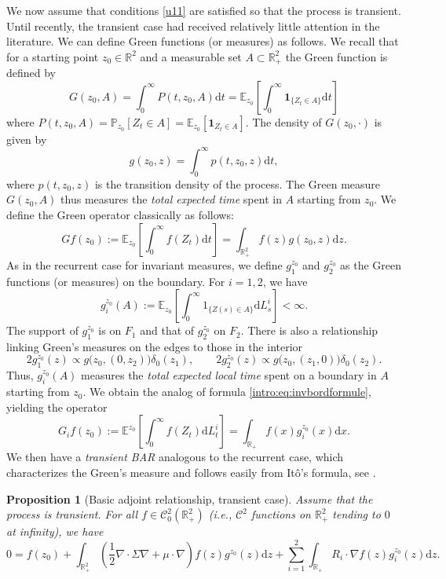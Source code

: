 \documentclass[11pt]{article}
\newcommand\citeS[1]{\cite{#1}}
\newtheorem{prop}[thm]{Proposition}
\theoremstyle{definition}
\begin{document}
We now assume that conditions \eqref{u11} are satisfied so that the process is transient. Until recently, the transient case had received relatively little attention in the literature. We can define Green functions (or measures) as follows.
We recall that for a starting point $z_0\in\mathbb{R}^2$ and a measurable set $A \subset \mathbb{R}_+^{2}$ the Green function is defined by
$$
G(z_0,A)= \int_0^{\infty} P(t,z_0,A)\mathrm{d} t = \mathbb{E}_{z_0} \left[ \int_{0}^{\infty} \mathbf{1}_{\{Z_t \in A \}} \mathrm{d} t \right] 
$$
where $P(t,{z_0},A)=\mathbb{P}_{z_0} [Z_t \in A ]=\mathbb{E}_{z_0} [\mathbf{1}_{Z_t \in A}]$. The density of $G(z_0, \cdot)$ is given by
$$g({z_0},z) =\int_0^{\infty} p(t,z_0,z)\mathrm{d} t,$$
where $p(t,z_0,z)$ is the transition density of the process.
The Green measure $G(z_0,A)$ thus measures the \textit{total expected time} spent in $A$ starting from $z_0$.
We define the Green operator classically as follows:
\begin{equation}
\label{eq:operateurG}
G f(z_0):=\mathbb{E}_{z_0}\left[\int_0^{\infty} f(Z_t) \mathrm{d} t\right]=\int_{\mathbb{R}_{+}^2} f(z) g(z_0, z) \mathrm{d} z .
\end{equation}
As in the recurrent case for invariant measures, we define $g_1^{z_0}$ and $g_2^{z_0}$ as the Green functions (or measures) on the boundary.
For $i=1,2$, we have
$$
g_i^{z_0} (A):= \mathbb{E}_{z_0} \left[ \int_0^\infty 1_{\{Z(s) \in A\}} \mathrm{d}L_s^i \right] <\infty .
$$
The support of $g_1^{z_0}$ is on $F_1$ and that of $g_2^{z_0}$ on $F_2$. There is also a relationship linking Green's measures on the edges to those in the interior
\[
2 g_1^{z_0}(z)\propto g\bigl(z_0,(0,z_2)\bigr) \delta_0(z_1),
\qquad
2 g_2^{z_0}(z)\propto g\bigl(z_0,(z_1,0)\bigr) \delta_0(z_2) .
\]
Thus, $g_i^{z_0} (A)$ measures the \textit{total expected local time} spent on a boundary in $A$ starting from $z_0$.
We obtain the analog of formula \eqref{intro:eq:invbordformule}, yielding the operator
\begin{equation}
\label{intro:eq:greenbordformule}
G_i f(z_0):= \mathbb{E}^{z_0} \left[\int_0^\infty f(Z_t) \mathrm{d}L^i_t \right] = \int_{\mathbb{R}_+} f(x) g_i^{z_0} (x) \mathrm{d}x.
\end{equation}
We then have a \emph{transient BAR} analogous to the recurrent case, which characterizes the Green's measure and follows easily from Itô's formula, see \citeS{franceschi_green_2021}.
\begin{prop}[Basic adjoint relationship, transient case]
\label{prop:bartransient} Assume that the process is transient.
For all $f \in \mathcal{C}^2_0 (\mathbb{R}_+^2)$ (i.e., $\mathcal{C}^2$ functions on $\mathbb{R}_+^2$ tending to $0$ at infinity), we have
\begin{equation}
0=f\left(z_0\right)+\int_{\mathbb{R}_{+}^2}\left(\frac{1}{2} \nabla \cdot \Sigma \nabla+\mu \cdot \nabla\right) f(z) g^{z_0}(z) \mathrm{d} z+\sum_{i=1}^2 \int_{\mathbb{R}_{+}} R_i \cdot \nabla f(z) g_i^{z_0}(z) \mathrm{d} z .
\label{eq:bartransient}
\end{equation}
\end{prop}
\end{document}
